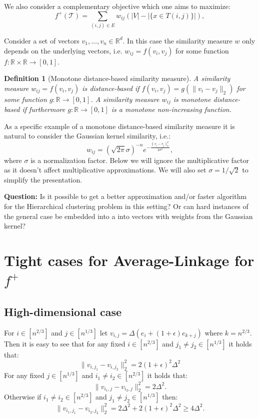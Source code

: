 \documentclass[twoside]{article}
\newtheorem{definition}{Definition}[section]
\begin{document}
We also consider a complementary objective which one aims to maximize:
$$f^+(\mathcal T) = \sum_{(i,j) \in E} w_{ij} (|V| - |\{x \in T(i,j)\}|),$$


Consider a set of vectors $v_1, \dots, v_n \in \mathbb R^d$. In this case the similarity measure $w$ only depends on the underlying vectors, i.e. $w_{ij} = f(v_i, v_j)$ for some function $f \colon \mathbb R \times \mathbb R \to [0,1]$.
\begin{definition}[Monotone distance-based similarity measure]
	A similarity measure $w_{ij} = f(v_i, v_j)$ is \emph{distance-based} if $f(v_i, v_j) = g(\|v_i - v_j\|_2)$ for some function $g \colon \mathbb R \to [0,1]$.
	A similarity measure $w_{ij}$ is \emph{monotone distance-based} if furthermore $g \colon \mathbb R \to [0,1]$ is a monotone non-increasing function.
\end{definition}

As a specific example of a monotone distance-based similarity measure it is natural to consider the Gaussian kernel similarity, i.e.: 
$$w_{ij} = (\sqrt{2 \pi} \sigma)^{-n} e^{- \frac{\|v_i - v_j\|_2^2}{2\sigma^2}},$$ 
where $\sigma$ is a normalization factor. Below we will ignore the multiplicative factor as it doesn't affect multiplicative approximations. We will also set $\sigma = 1/\sqrt{2}$ to simplify the presentation.

\textbf{Question:} Is it possible to get a better approximation and/or faster algorithm for the Hierarchical clustering problem in this setting? Or can hard instances of the general case be embedded into a into vectors with weights from the Gaussian kernel?

\section{Tight cases for Average-Linkage for $f^+$}

\subsection{High-dimensional case}
For $i \in [n^{2/3}]$ and $j \in [n^{1/3}]$ let $v_{i,j} = \Delta (e_i + (1 + \epsilon)e_{k + j})$ where $k = n^{2/3}$.
Then it is easy to see that for any fixed $i \in [n^{2/3}]$ and $j_1 \neq j_2 \in [n^{1/3}]$ it holds that:
$$\|v_{i,j_1} - v_{i, j_2}\|_2^2 = 2 (1 + \epsilon)^2 \Delta^2$$
For any fixed $j \in [n^{1/3}]$ and $i_1 \neq i_2 \in [n^{2/3}]$ it holds that:
$$\|v_{i_1, j} - v_{i_2,j}\|_2^2 = 2 \Delta^2.$$
Otherwise if $i_1 \neq i_2 \in [n^{2/3}]$ and $j_1 \neq j_2  \in [n^{1/3}]$ then:
$$\|v_{i_1, j_1} - v_{i_2, j_2}\|_2^2 = 2 \Delta^2 + 2 (1 + \epsilon)^2 \Delta^2 \ge 4 \Delta^2.$$
\end{document}
